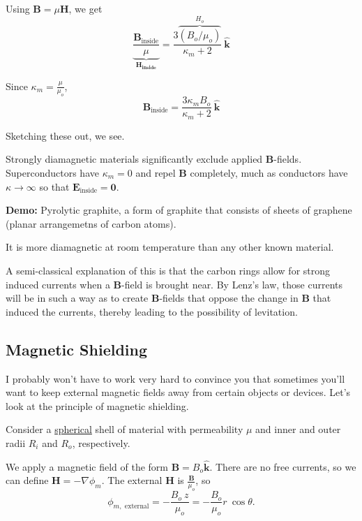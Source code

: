 \documentclass{article}
\numberwithin{equation}{section}
\newcommand{\khat}{\mathbf{\hat{k}}}
\begin{document}
Using $\bm{B} = \mu \bm{H}$, we get
\begin{equation*}
    \underbrace{\frac{\bm{B}_{\text{inside}}}{\mu}}_{\bm{H_{\text{inside}}}} = \frac{3 \overbrace{\left( B_o / \mu_o \right)}^{H_o}}{\kappa_m + 2}\ \khat
\end{equation*}

Since $\displaystyle \kappa_m = \frac{\mu}{\mu_o}$,
\begin{equation*}
    \boxed{\bm{B}_{\text{inside}} = \frac{3 \kappa_m B_o}{\kappa_m + 2}\ \khat}
\end{equation*}

Sketching these out, we see.

Strongly diamagnetic materials significantly exclude applied $\bm{B}$-fields. Superconductors have $\kappa_m = 0$ and repel $\bm{B}$ completely, much as conductors have $\kappa \to \infty$ so that $\bm{E}_{\text{inside}} = \bm{0}$.

\textbf{Demo: } Pyrolytic graphite, a form of graphite that consists of sheets of graphene (planar arrangemetns of carbon atoms).

It is more diamagnetic at room temperature than any other known material.

A semi-classical explanation of this is that the carbon rings allow for strong induced currents when a $\bm{B}$-field is brought near. By Lenz's law, those currents will be in such a way as to create $\bm{B}$-fields that oppose the change in $\bm{B}$ that induced the currents, thereby leading to the possibility of levitation.

\subsection*{Magnetic Shielding}

I probably won't have to work very hard to convince you that sometimes you'll want to keep external magnetic fields away from certain objects or devices. Let's look at the principle of magnetic shielding.

Consider a \underline{spherical} shell of material with permeability $\mu$ and inner and outer radii $R_i$ and $R_o$, respectively.

We apply a magnetic field of the form $\bm{B} = B_o \khat$. There are no free currents, so we can define $\bm{H} = -\nabla \phi_m$. The external $\bm{H}$ is $\displaystyle \frac{\bm{B}}{\mu_o}$, so
\begin{equation*}
    \phi_{m, \text{ external}} = -\frac{B_o\ z}{\mu_o} = -\frac{B_o}{\mu_o} r\ \cos{\theta}.
\end{equation*}
\end{document}
